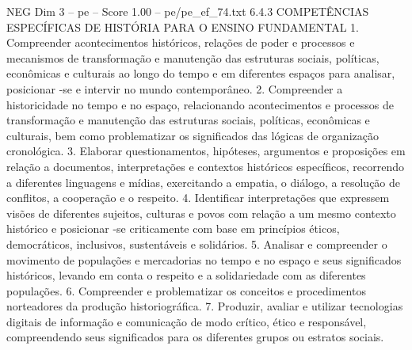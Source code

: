 \begin{textsample}{NEG Dim 3 – pe – Score 1.00 – pe/pe\_ef\_74.txt}  \label{ex:f3_neg_016}
6.4.3 COMPETÊNCIAS ESPECÍFICAS DE HISTÓRIA PARA O ENSINO FUNDAMENTAL 1.
Compreender acontecimentos históricos, relações de poder e processos e mecanismos de transformação e manutenção das estruturas sociais, políticas, econômicas e culturais ao longo do tempo e em diferentes espaços para analisar, posicionar -se e intervir no mundo contemporâneo. 2.
Compreender a historicidade no tempo e no espaço, relacionando acontecimentos e processos de transformação e manutenção das estruturas sociais, políticas, econômicas e culturais, bem como problematizar os significados das lógicas de organização cronológica. 3.
Elaborar questionamentos, hipóteses, argumentos e proposições em relação a documentos, interpretações e contextos históricos específicos, recorrendo a diferentes linguagens e mídias, exercitando a empatia, o diálogo, a resolução de conflitos, a cooperação e o respeito. 4.
Identificar interpretações que expressem visões de diferentes sujeitos, culturas e povos com relação a um mesmo contexto histórico e posicionar -se criticamente com base em princípios éticos, democráticos, inclusivos, sustentáveis e solidários. 5.
Analisar e compreender o movimento de populações e mercadorias no tempo e no espaço e seus significados históricos, levando em conta o respeito e a solidariedade com as diferentes populações. 6.
Compreender e problematizar os conceitos e procedimentos norteadores da produção historiográfica. 7.
Produzir, avaliar e utilizar tecnologias digitais de informação e comunicação de modo crítico, ético e responsável, compreendendo seus significados para os diferentes grupos ou estratos sociais.

\end{textsample}
